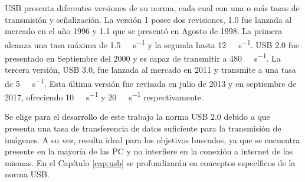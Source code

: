 USB presenta diferentes versiones de su norma, cada cual con una o más tasas de transmisión y señalización. La versión 1 posee dos revisiones, 1.0 fue lanzada al mercado en el año 1996 y 1.1 que se presentó en Agosto de 1998. La primera alcanza una tasa máxima de \SI{1.5}{\mega\bit\per\second} y la segunda hasta \SI{12}{\mega\bit\per\second}. USB 2.0 fue presentado en Septiembre del 2000 y es capaz de transmitir a \SI{480}{\mega\bit\per\second}. La tercera versión, USB 3.0, fue lanzada al mercado en 2011 y transmite a una tasa de \SI{5}{\giga\bit\per\second}. Esta última versión fue revisada en julio de 2013 y en septiembre de 2017, ofreciendo \SI{10}{\giga\bit\per\second} y \SI{20}{\giga\bit\per\second} respectivamente.%


Se elige para el desarrollo de este trabajo la norma USB 2.0 debido a que presenta una tasa de transferencia de datos suficiente para la transmisión de imágenes. A su vez, resulta ideal para los objetivos buscados, ya que se encuentra presente en la mayoría de las PC y no interfiere en la conexión a internet de las mismas. En el Capítulo \ref{cap:usb} se profundizarán en conceptos específicos de la norma USB.%

